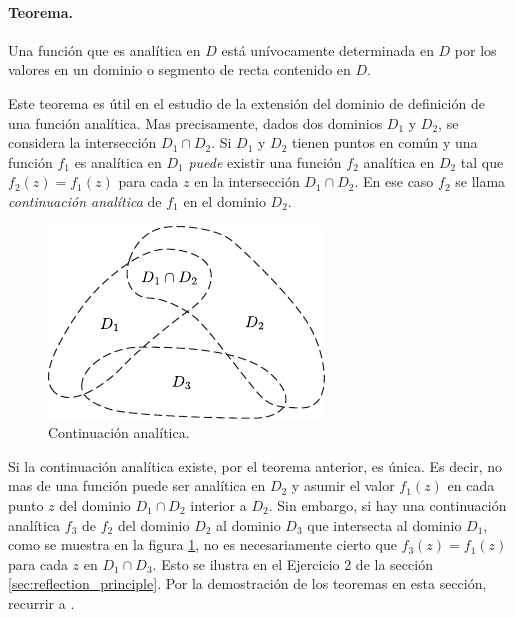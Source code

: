 \documentclass[a4paper]{report}
\begin{document}
\paragraph{Teorema.} Una función que es analítica en \(D\) está unívocamente determinada en \(D\) por los valores en un dominio o segmento de recta contenido en \(D\).

Este teorema es útil en el estudio de la extensión del dominio de definición de una función analítica. Mas precisamente, dados dos dominios \(D_1\) y \(D_2\), se considera la intersección \(D_1\cap D_2\). Si \(D_1\) y \(D_2\) tienen puntos en común y una función \(f_1\) es analítica en \(D_1\) \emph{puede} existir una función \(f_2\) analítica en \(D_2\) tal que \(f_2(z)=f_1(z)\) para cada \(z\) en la intersección \(D_1\cap D_2\). En ese caso \(f_2\) se llama \emph{continuación analítica} de \(f_1\) en el dominio \(D_2\).
\begin{figure}[!htb]
  \begin{minipage}[c]{0.4\textwidth}
    \includegraphics[width=\textwidth]{figuras/analytic_continuation.pdf}
  \end{minipage}\hfill
  \begin{minipage}[c]{0.5\textwidth}
    \caption{
       Continuación analítica.
    } \label{fig:analytic_continuation}
  \end{minipage}
\end{figure}

Si la continuación analítica existe, por el teorema anterior, es única. Es decir, no mas de una función puede ser analítica en \(D_2\) y asumir el valor \(f_1(z)\) en cada punto \(z\) del dominio \(D_1\cap D_2\) interior a \(D_2\). Sin embargo, si hay una continuación analítica \(f_3\) de \(f_2\) del dominio \(D_2\) al dominio \(D_3\) que intersecta al dominio \(D_1\), como se muestra en la figura \ref{fig:analytic_continuation}, no es necesariamente cierto que \(f_3(z)=f_1(z)\) para cada \(z\) en \(D_1\cap D_3\). Esto se ilustra en el Ejercicio 2 de la sección \ref{sec:reflection_principle}. Por la demostración de los teoremas en esta sección, recurrir a \cite{brown2013complex}.
\end{document}
